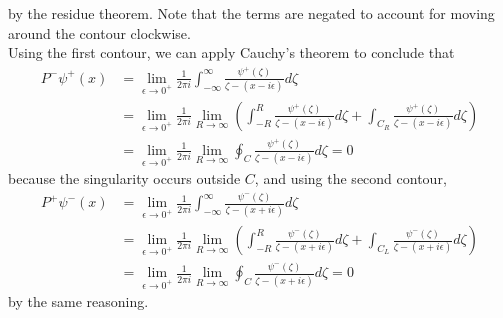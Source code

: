 \documentclass{article}
\begin{document}
by the residue theorem. Note that the terms are negated to account for moving around the contour clockwise.\\
Using the first contour, we can apply Cauchy's theorem to conclude that
\begin{align*}
P^-\psi^+(x)&=\lim_{\epsilon\to0^+}\frac{1}{2\pi i}\int_{-\infty}^\infty\frac{\psi^+(\zeta)}{\zeta-(x-i\epsilon)}d\zeta\\&=
\lim_{\epsilon\to0^+}\frac{1}{2\pi i}\lim_{R\to\infty}\left(\int_{-R}^R\frac{\psi^+(\zeta)}{\zeta-(x-i\epsilon)}d\zeta+\int_{C_R}\frac{\psi^+(\zeta)}{\zeta-(x-i\epsilon)}d\zeta\right)\\&=
\lim_{\epsilon\to0^+}\frac{1}{2\pi i}\lim_{R\to\infty}\oint_C\frac{\psi^+(\zeta)}{\zeta-(x-i\epsilon)}d\zeta=0
\end{align*}
because the singularity occurs outside $C$, and using the second contour, 
\begin{align*}
P^+\psi^-(x)&=\lim_{\epsilon\to0^+}\frac{1}{2\pi i}\int_{-\infty}^\infty\frac{\psi^-(\zeta)}{\zeta-(x+i\epsilon)}d\zeta\\&=
\lim_{\epsilon\to0^+}\frac{1}{2\pi i}\lim_{R\to\infty}\left(\int_{-R}^R\frac{\psi^-(\zeta)}{\zeta-(x+i\epsilon)}d\zeta+\int_{C_L}\frac{\psi^-(\zeta)}{\zeta-(x+i\epsilon)}d\zeta\right)\\&=
\lim_{\epsilon\to0^+}\frac{1}{2\pi i}\lim_{R\to\infty}\oint_C\frac{\psi^-(\zeta)}{\zeta-(x+i\epsilon)}d\zeta=0
\end{align*}
by the same reasoning. 
\end{document}
